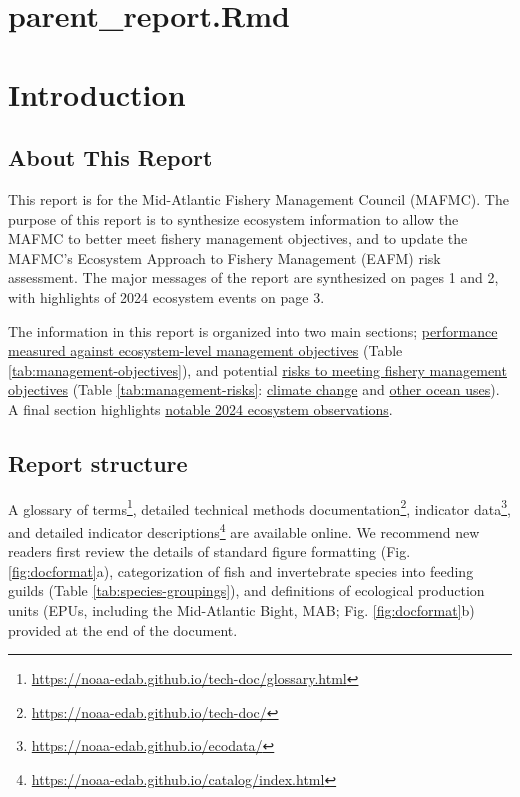 \documentclass[
  10pt,
]{article}
\author{}
\date{\vspace{-2.5em}}
\begin{document}
\section{parent\_report.Rmd}\label{parent_report.rmd}

\setcounter{page}{4}
\thispagestyle{fancy}

\section{Introduction}\label{introduction}

\subsection{About This Report}\label{about-this-report}

This report is for the Mid-Atlantic Fishery Management Council (MAFMC). The purpose of this report is to synthesize ecosystem information to allow the MAFMC to better meet fishery management objectives, and to update the MAFMC's Ecosystem Approach to Fishery Management (EAFM) risk assessment. The major messages of the report are synthesized on pages 1 and 2, with highlights of 2024 ecosystem events on page 3.

The information in this report is organized into two main sections; \hyperref[performance-relative-to-fishery-management-objectives]{performance measured against ecosystem-level management objectives} (Table \ref{tab:management-objectives}), and potential \hyperref[risks-to-meeting-fishery-management-objectives]{risks to meeting fishery management objectives} (Table \ref{tab:management-risks}: \hyperref[climate-and-ecosystem-change]{climate change} and \hyperref[other-ocean-uses-offshore-wind]{other ocean uses}). A final section highlights \hyperref[highlights]{notable 2024 ecosystem observations}.

\subsection{Report structure}\label{report-structure}

A glossary of terms\footnote{\url{https://noaa-edab.github.io/tech-doc/glossary.html}}, detailed technical methods documentation\footnote{\url{https://noaa-edab.github.io/tech-doc/}}, indicator data\footnote{\url{https://noaa-edab.github.io/ecodata/}}, and detailed indicator descriptions\footnote{\url{https://noaa-edab.github.io/catalog/index.html}} are available online. We recommend new readers first review the details of standard figure formatting (Fig. \ref{fig:docformat}a), categorization of fish and invertebrate species into feeding guilds (Table \ref{tab:species-groupings}), and definitions of ecological production units (EPUs, including the Mid-Atlantic Bight, MAB; Fig. \ref{fig:docformat}b) provided at the end of the document.
\end{document}
